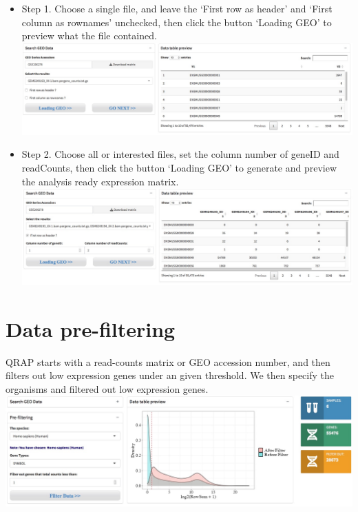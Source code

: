 \documentclass[
  a4paper,
  oneside]{book}
\providecommand{\tightlist}{%
  \setlength{\itemsep}{0pt}\setlength{\parskip}{0pt}}
\begin{document}
\begin{itemize}
\tightlist
\item
  Step 1. Choose a single file, and leave the `First row as header' and `First column as rownames' unchecked, then click the button `Loading GEO' to preview what the file contained.\\
  \includegraphics{images/geo_preview_multiple_setp1.jpeg}
\item
  Step 2. Choose all or interested files, set the column number of geneID and readCounts, then click the button `Loading GEO' to generate and preview the analysis ready expression matrix.\\
  \includegraphics{images/geo_preview_multiple_setp2.jpeg}
\end{itemize}

\hypertarget{data-pre-filtering}{%
\section{Data pre-filtering}\label{data-pre-filtering}}

QRAP starts with a read-counts matrix or GEO accession number, and then filters out low expression genes under an given threshold. We then specify the organisms and filtered out low expression genes.\\
\includegraphics{images/prefiltering.jpeg}
\end{document}
